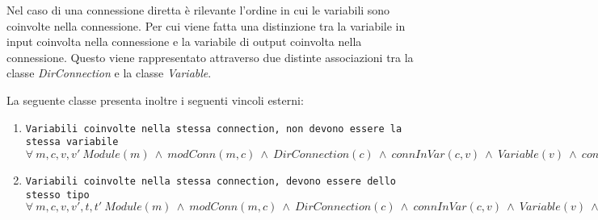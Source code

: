 
Nel caso di una connessione diretta è rilevante l'ordine in cui le variabili sono coinvolte nella connessione. Per cui viene fatta una distinzione tra la variabile in input coinvolta nella connessione e la variabile di output coinvolta nella connessione. Questo viene rappresentato attraverso due distinte associazioni tra la classe \textit{DirConnection} e la classe \textit{Variable}.

La seguente classe presenta inoltre i seguenti vincoli esterni:
\begin{enumerate}
	\item \texttt{Variabili coinvolte nella stessa connection, non devono essere la stessa variabile} \\
		  $\forall \ m,c,v,v' \ Module(m) \ \land \ modConn(m, c) \ \land \ DirConnection(c) \ \land \ connInVar(c, v)\ \land \ Variable(v) \ \land \ connOutVar(c, v') \ \land \ Variable(v') \ \Rightarrow \ v \neq v'$ \\
	\item \texttt{Variabili coinvolte nella stessa connection, devono essere dello stesso tipo} \\
		  $\forall \ m,c,v,v',t,t' \ Module(m) \ \land \ modConn(m, c) \ \land \ DirConnection(c) \ \land \ connInVar(c, v)\ \land \ Variable(v) \ \land \ typeExpr(t, v) \ \land \ Type(t) \ \land \ connOutVar(c, v') \ \land \ Variable(v') \ \Rightarrow \ typeExpr(t, v')$ \\
\end{enumerate}